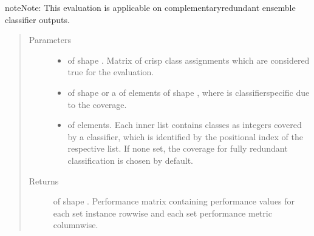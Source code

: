 \documentclass[letterpaper,10pt,english]{sphinxmanual}
\begin{document}
\begin{fulllineitems}
\begin{fulllineitems}
\begin{sphinxadmonition}{note}{Note:}
\sphinxAtStartPar
This evaluation is applicable on complementary\sphinxhyphen{}redundant ensemble classifier outputs.
\end{sphinxadmonition}
\begin{quote}\begin{description}
\item[{Parameters}] \leavevmode\begin{itemize}
\item {} 
\sphinxAtStartPar
{} \textendash{}  of shape .
Matrix of crisp class assignments which are considered true for the evaluation.

\item {} 
\sphinxAtStartPar
{} \textendash{}  of shape  or a  of
 elements of shape , where  is classifier\sphinxhyphen{}specific
due to the coverage.

\item {} 
\sphinxAtStartPar
{} \textendash{}  of  elements. Each inner list contains classes as integers covered by a
classifier, which is identified by the positional index of the respective list.
If none set, the coverage for fully redundant classification is chosen by default.

\end{itemize}

\item[{Returns}] \leavevmode
\sphinxAtStartPar
{} of shape . Performance matrix containing performance values
for each set instance row\sphinxhyphen{}wise and each set performance metric column\sphinxhyphen{}wise.

\end{description}\end{quote}

\end{fulllineitems}



\end{fulllineitems}
\end{document}
